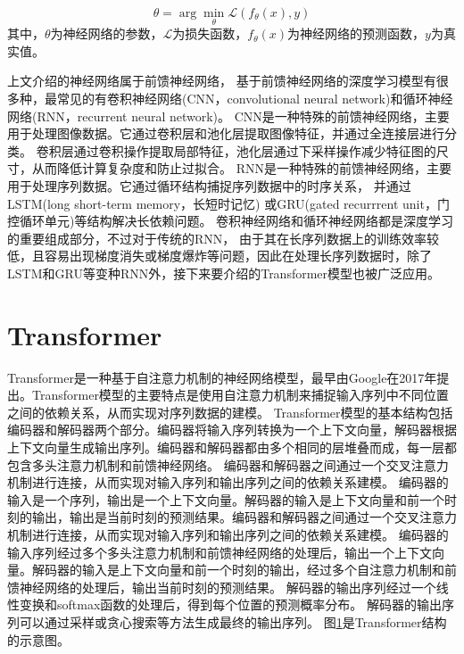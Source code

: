 \begin{equation}
  \theta = \arg\min_{\theta} \mathcal{L}(f_\theta(x), y)
\end{equation}
其中，$\theta$为神经网络的参数，$\mathcal{L}$为损失函数，$f_\theta(x)$为神经网络的预测函数，$y$为真实值。


上文介绍的神经网络属于前馈神经网络，
基于前馈神经网络的深度学习模型有很多种，最常见的有卷积神经网络(CNN，convolutional neural network)和循环神经网络(RNN，recurrent neural network)。
CNN是一种特殊的前馈神经网络，主要用于处理图像数据。它通过卷积层和池化层提取图像特征，并通过全连接层进行分类。
卷积层通过卷积操作提取局部特征，池化层通过下采样操作减少特征图的尺寸，从而降低计算复杂度和防止过拟合。
RNN是一种特殊的前馈神经网络，主要用于处理序列数据。它通过循环结构捕捉序列数据中的时序关系，
并通过LSTM(long short-term memory，长短时记忆)\cite{hochreiter1997long}
或GRU(gated recurrrent unit，门控循环单元)\cite{DBLP:journals/corr/ChoMGBSB14}等结构解决长依赖问题。
卷积神经网络和循环神经网络都是深度学习的重要组成部分，不过对于传统的RNN，
由于其在长序列数据上的训练效率较低，且容易出现梯度消失或梯度爆炸等问题，因此在处理长序列数据时，除了
LSTM和GRU等变种RNN外，接下来要介绍的Transformer模型也被广泛应用。

\section{Transformer}\label{transformer}

Transformer是一种基于自注意力机制的神经网络模型，最早由Google在2017年提出\cite{vaswani2017attention}。Transformer模型的主要特点是使用自注意力机制来捕捉输入序列中不同位置之间的依赖关系，从而实现对序列数据的建模。
Transformer模型的基本结构包括编码器和解码器两个部分。编码器将输入序列转换为一个上下文向量，解码器根据上下文向量生成输出序列。编码器和解码器都由多个相同的层堆叠而成，每一层都包含多头注意力机制和前馈神经网络。
编码器和解码器之间通过一个交叉注意力机制进行连接，从而实现对输入序列和输出序列之间的依赖关系建模。
编码器的输入是一个序列，输出是一个上下文向量。解码器的输入是上下文向量和前一个时刻的输出，输出是当前时刻的预测结果。编码器和解码器之间通过一个交叉注意力机制进行连接，从而实现对输入序列和输出序列之间的依赖关系建模。
编码器的输入序列经过多个多头注意力机制和前馈神经网络的处理后，输出一个上下文向量。解码器的输入是上下文向量和前一个时刻的输出，经过多个自注意力机制和前馈神经网络的处理后，输出当前时刻的预测结果。
解码器的输出序列经过一个线性变换和softmax函数的处理后，得到每个位置的预测概率分布。
解码器的输出序列可以通过采样或贪心搜索等方法生成最终的输出序列。
图\ref{transformer}是Transformer结构的示意图。

